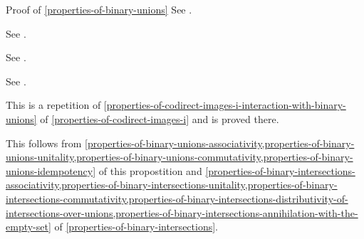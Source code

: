 \begin{Proof}{Proof of \cref{properties-of-binary-unions}}
    See \cite{proof-wiki:characteristic-function-of-union}.

    See \cite{proof-wiki:characteristic-function-of-union}.

    See \cite{proof-wiki:image-of-union-under-mapping}.

    See \cite{proof-wiki:preimage-of-union-under-mapping}.

    This is a repetition of \cref{properties-of-codirect-images-i-interaction-with-binary-unions} of \cref{properties-of-codirect-images-i} and is proved there.

    This follows from \cref{properties-of-binary-unions-associativity,properties-of-binary-unions-unitality,properties-of-binary-unions-commutativity,properties-of-binary-unions-idempotency} of this propostition and \cref{properties-of-binary-intersections-associativity,properties-of-binary-intersections-unitality,properties-of-binary-intersections-commutativity,properties-of-binary-intersections-distributivity-of-intersections-over-unions,properties-of-binary-intersections-annihilation-with-the-empty-set} of \cref{properties-of-binary-intersections}.
\end{Proof}
